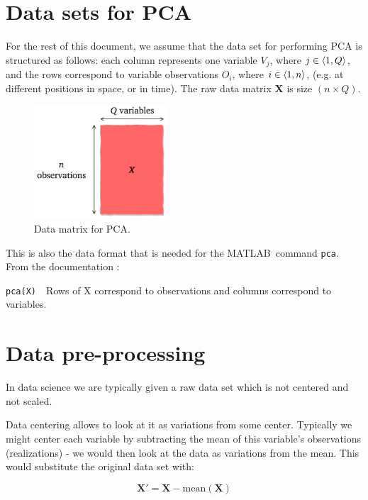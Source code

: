 \documentclass[10pt,twocolumn]{article}
\begin{document}
\section{Data sets for PCA}

For the rest of this document, we assume that the data set for performing PCA is structured as follows: each column represents one variable $V_j$, where $j \in \braket{1, Q}$, and the rows correspond to variable observations $O_i$, where $i \in \braket{1, n}$, (e.g. at different positions in space, or in time). The raw data matrix $\bm{X}$ is size $(n \times Q)$.

\begin{figure}[H]
\centering\includegraphics[width=5cm]{data-set-PCA.png}
\caption{Data matrix for PCA.}
\label{fig:data-matrix}
\end{figure}

This is also the data format that is needed for the MATLAB\textregistered \, command \texttt{pca}. From the documentation \cite{Matlab-pca}:


\begin{framed}
\texttt{pca(X)}
\,\,
Rows of X correspond to observations and columns correspond to variables.
\end{framed}

\section{Data pre-processing}

In data science we are typically given a raw data set which is not centered and not scaled. 

Data centering allows to look at it as variations from some center. Typically we might center each variable by subtracting the mean of this variable's observations (realizations) - we would then look at the data as variations from the mean. This would substitute the original data set with:

\begin{equation}
\bm{X'} = \bm{X} - \text{mean}(\bm{X})
\end{equation}
\end{document}
